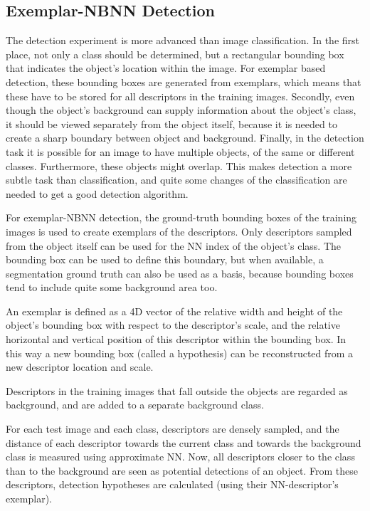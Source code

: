 \subsection{Exemplar-NBNN Detection} %
\label{sec:nbnn_detection}
The detection experiment is more advanced than image classification. In the first place, not only a class should be determined, but a rectangular bounding box that indicates the object's location within the image. For exemplar based detection, these bounding boxes are generated from exemplars, which means that these have to be stored for all descriptors in the training images. Secondly, even though the object's background can supply information about the object's class, it should be viewed separately from the object itself, because it is needed to create a sharp boundary between object and background. Finally, in the detection task it is possible for an image to have multiple objects, of the same or different classes. Furthermore, these objects might overlap. This makes detection a more subtle task than classification, and quite some changes of the classification are needed to get a good detection algorithm.

For exemplar-NBNN detection, the ground-truth bounding boxes of the training images is used to create exemplars of the descriptors. Only descriptors sampled from the object itself can be used for the NN index of the object's class. The bounding box can be used to define this boundary, but when available, a segmentation ground truth can also be used as a basis, because bounding boxes tend to include quite some background area too. 

An exemplar is defined as a 4D vector of the relative width and height of the object's bounding box with respect to the descriptor's scale, and the relative horizontal and vertical position of this descriptor within the bounding box. In this way a new bounding box (called a hypothesis) can be reconstructed from a new descriptor location and scale.

Descriptors in the training images that fall outside the objects are regarded as background, and are added to a separate background class.

For each test image and each class, descriptors are densely sampled, and the distance of each descriptor towards the current class and towards the background class is measured using approximate NN. Now, all descriptors closer to the class than to the background are seen as potential detections of an object. From these descriptors, detection hypotheses are calculated (using their NN-descriptor's exemplar).

